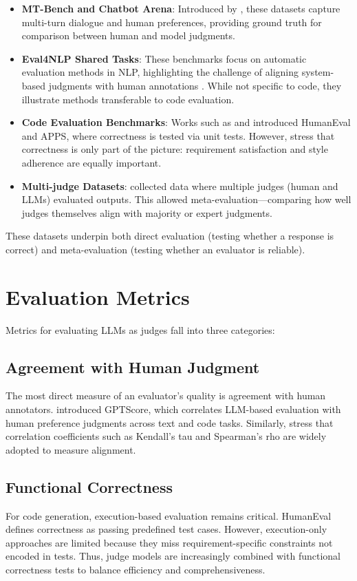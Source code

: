 \begin{itemize}
    \item \textbf{MT-Bench and Chatbot Arena}: Introduced by \citet{zheng2023judgelm}, these datasets capture multi-turn dialogue and human preferences, providing ground truth for comparison between human and model judgments.
    \item \textbf{Eval4NLP Shared Tasks}: These benchmarks focus on automatic evaluation methods in NLP, highlighting the challenge of aligning system-based judgments with human annotations \citep{zeng2023llm}. While not specific to code, they illustrate methods transferable to code evaluation.
    \item \textbf{Code Evaluation Benchmarks}: Works such as \citet{chen2021evaluating} and \citet{hendrycks2021measuring} introduced HumanEval and APPS, where correctness is tested via unit tests. However, \citet{fu2023gptscore} stress that correctness is only part of the picture: requirement satisfaction and style adherence are equally important.
    \item \textbf{Multi-judge Datasets}: \citet{wang2023aligning} collected data where multiple judges (human and LLMs) evaluated outputs. This allowed meta-evaluation—comparing how well judges themselves align with majority or expert judgments.
\end{itemize}

These datasets underpin both direct evaluation (testing whether a response is correct) and meta-evaluation (testing whether an evaluator is reliable).

\section{Evaluation Metrics}
Metrics for evaluating LLMs as judges fall into three categories:

\subsection{Agreement with Human Judgment}
The most direct measure of an evaluator’s quality is agreement with human annotators.\citet{fu2023gptscore} introduced GPTScore, which correlates LLM-based evaluation with human preference judgments across text and code tasks. Similarly, \citet{xu2023survey} stress that correlation coefficients such as Kendall’s tau and Spearman’s rho are widely adopted to measure alignment.

\subsection{Functional Correctness}
For code generation, execution-based evaluation remains critical. HumanEval \citep{chen2021evaluating} defines correctness as passing predefined test cases. However, execution-only approaches are limited because they miss requirement-specific constraints not encoded in tests. Thus, judge models are increasingly combined with functional correctness tests to balance efficiency and comprehensiveness.

